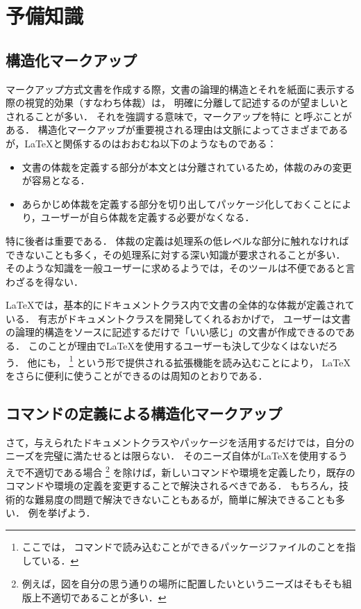 \chapter{予備知識} \label{chap:markup}

\section{構造化マークアップ} \label{sec:markup}

マークアップ方式文書を作成する際，文書の論理的構造とそれを紙面に表示する際の視覚的効果（すなわち体裁）は，
明確に分離して記述するのが望ましいとされることが多い．
それを強調する意味で，マークアップを特に%
%
%
と呼ぶことがある．
構造化マークアップが重要視される理由は文脈によってさまざまであるが，{\LaTeX}と関係するのはおおむね以下のようなものである：
\begin{itemize}
    \item 文書の体裁を定義する部分が本文とは分離されているため，体裁のみの変更が容易となる．
    \item あらかじめ体裁を定義する部分を切り出してパッケージ化しておくことにより，ユーザーが自ら体裁を定義する必要がなくなる．
\end{itemize}
特に後者は重要である．
体裁の定義は処理系の低レベルな部分に触れなければできないことも多く，その処理系に対する深い知識が要求されることが多い．
そのような知識を一般ユーザーに求めるようでは，そのツールは不便であると言わざるを得ない．

{\LaTeX}では，基本的にドキュメントクラス内で文書の全体的な体裁が定義されている．
有志がドキュメントクラスを開発してくれるおかげで，
ユーザーは文書の論理的構造をソースに記述するだけで「いい感じ」の文書が作成できるのである．
このことが理由で{\LaTeX}を使用するユーザーも決して少なくはないだろう．
他にも，
%
%
\footnote{%
ここでは，
%
コマンドで読み込むことができるパッケージファイルのことを指している．
}%
という形で提供される拡張機能を読み込むことにより，
{\LaTeX}をさらに便利に使うことができるのは周知のとおりである．

\section{コマンドの定義による構造化マークアップ} \label{sec:exampleinlatex}

さて，与えられたドキュメントクラスやパッケージを活用するだけでは，自分のニーズを完璧に満たせるとは限らない．
そのニーズ自体が{\LaTeX}を使用するうえで不適切である場合%
\footnote{%
例えば，図を自分の思う通りの場所に配置したいというニーズはそもそも組版上不適切であることが多い．
}%
を除けば，新しいコマンドや環境を定義したり，既存のコマンドや環境の定義を変更することで解決されるべきである．
もちろん，技術的な難易度の問題で解決できないこともあるが，簡単に解決できることも多い．
例を挙げよう．

